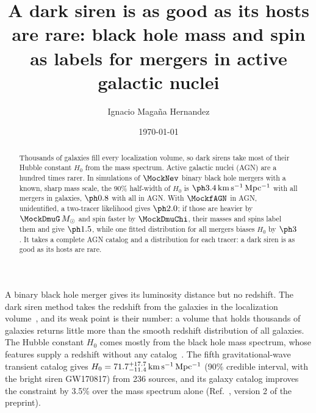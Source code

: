 \documentclass[aps,prd,reprint,superscriptaddress,nofootinbib]{revtex4-2}
\newcommand{\kms}{\,{\rm km\,s^{-1}\,Mpc^{-1}}}
\newcommand{\Msun}{\,M_\odot}
\begin{document}
\title{A dark siren is as good as its hosts are rare: black hole mass and spin as labels for
mergers in active galactic nuclei}

\author{Ignacio Maga\~na Hernandez}

\date{\today}

\begin{abstract}
Thousands of galaxies fill every localization volume, so dark sirens take most of their Hubble
constant $H_0$ from the mass spectrum. Active galactic nuclei (AGN) are a hundred times rarer.
In simulations of $\MockNev$ binary black hole mergers with a known, sharp mass scale, the 90\%
half-width of $H_0$ is $\IndHWGal\kms$ with all mergers in galaxies, $\IndHWAGN$ with all in
AGN. %
With $\MockfAGN$ in AGN, unidentified, a two-tracer likelihood gives $\IndHWMix$; if those are
heavier by $\MockDmuG\Msun$ and spin faster by $\MockDmuChi$, their masses and spins label them
and give $\IndHWMark$, while one fitted distribution for all mergers biases $H_0$ by
$\IndBias$. %
It takes a complete AGN catalog and a distribution for each tracer: a dark siren is as good as
its hosts are rare.
\end{abstract}

\maketitle


A binary black hole merger gives its luminosity distance but no redshift. The dark siren
method takes the redshift from the galaxies in the localization
volume~\cite{Schutz:1986gp,Gray:2019ksv,Gair:2022zsa}, and its weak point is their number: a
volume that holds thousands of galaxies returns little more than the smooth redshift distribution
of all galaxies. The Hubble constant $H_0$ comes mostly from the black hole mass spectrum, whose
features supply a redshift without any
catalog~\cite{Taylor:2011fs,Farr:2019twy,Ezquiaga:2022zkx,Mastrogiovanni:2021wsd}. The fifth
gravitational-wave transient catalog gives $H_0=71.7^{+17.7}_{-11.4}\kms$ (90\% credible
interval, with the bright siren GW170817) from 236 sources, and its galaxy catalog improves the
constraint by 3.5\% over the mass spectrum alone (Ref.~\cite{LIGOScientific:2026uyd}, version 2
of the preprint).
\end{document}
